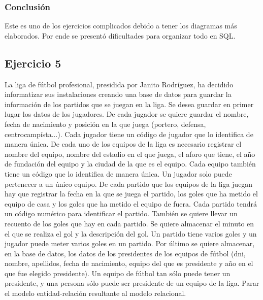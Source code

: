 \documentclass[a4paper, 12pt]{article}
\begin{document}
\begin{justify}
        \subsubsection{Conclusión}
        \justify
        Este es uno de los ejercicios complicados debido a tener los diagramas más elaborados. Por ende se presentó dificultades para organizar todo en SQL.
        \subsection{Ejercicio 5}
        \justify
        La liga de fútbol profesional, presidida por Janito Rodríguez, ha decidido informatizar sus instalaciones creando una base de datos para guardar la información de los partidos que se juegan en la liga.
        Se desea guardar en primer lugar los datos de los jugadores. De cada jugador se quiere guardar el nombre, fecha de nacimiento y posición en la que juega (portero, defensa, centrocampísta...). Cada jugador
        tiene un código de jugador que lo identifica de manera única. De cada uno de los equipos de la liga es necesario registrar el nombre del equipo, nombre del estadio en el que juega, el aforo que tiene, el año
        de fundación del equipo y la ciudad de la que es el equipo. Cada equipo también tiene un código que lo identifica de manera única. Un jugador solo puede pertenecer a un único equipo. De cada partido que los equipos
        de la liga juegan hay que registrar la fecha en la que se juega el partido, los goles que ha metido el equipo de casa y los goles que ha metido el equipo de fuera. Cada partido tendrá un código numérico para identificar
        el partido. También se quiere llevar un recuento de los goles que hay en cada partido. Se quiere almacenar el minuto en el que se realiza el gol y la descripción del gol. Un partido tiene varios goles y un jugador
        puede meter varios goles en un partido. Por último se quiere almacenar, en la base de datos, los datos de los presidentes de los equipos de fútbol (dni, nombre, apellidos, fecha de nacimiento, equipo del que es presidente
        y año en el que fue elegido presidente). Un equipo de fútbol tan sólo puede tener un presidente, y una persona sólo puede ser presidente de un equipo de la liga. Parar el modelo entidad-relación resultante al modelo relacional.

\end{justify}
\end{document}
